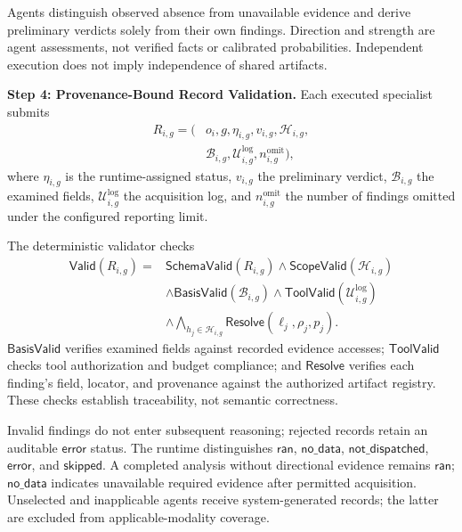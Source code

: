 Agents distinguish observed absence
from unavailable evidence and derive
preliminary verdicts solely from their
own findings. Direction and strength
are agent assessments, not verified
facts or calibrated probabilities.
Independent execution does not imply
independence of shared artifacts.

\medskip
\noindent\textbf{Step 4: Provenance-Bound
Record Validation.}
Each executed specialist submits
\begin{equation}
\begin{aligned}
R_{i,g}=\big(
&o_i,g,\eta_{i,g},v_{i,g},
\mathcal H_{i,g},\\
&\mathcal B_{i,g},
\mathcal U_{i,g}^{\mathrm{log}},
n_{i,g}^{\mathrm{omit}}
\big),
\end{aligned}
\label{eq:finding-record}
\end{equation}
where $\eta_{i,g}$ is the runtime-assigned
status, $v_{i,g}$ the preliminary
verdict, $\mathcal B_{i,g}$ the
examined fields,
$\mathcal U_{i,g}^{\mathrm{log}}$
the acquisition log, and
$n_{i,g}^{\mathrm{omit}}$ the
number of findings omitted under
the configured reporting limit.

The deterministic validator checks
\begin{equation}
\begin{aligned}
\mathsf{Valid}(R_{i,g})={}&
\mathsf{SchemaValid}(R_{i,g})
\land\mathsf{ScopeValid}(\mathcal H_{i,g})\\
&\land\mathsf{BasisValid}(\mathcal B_{i,g})
\land\mathsf{ToolValid}
(\mathcal U_{i,g}^{\mathrm{log}})\\
&\land\!\!
\bigwedge_{h_j\in\mathcal H_{i,g}}
\mathsf{Resolve}(\ell_j,\rho_j,p_j).
\end{aligned}
\label{eq:record-validity}
\end{equation}
$\mathsf{BasisValid}$ verifies
examined fields against recorded
evidence accesses;
$\mathsf{ToolValid}$ checks tool
authorization and budget compliance;
and $\mathsf{Resolve}$ verifies each
finding's field, locator, and
provenance against the authorized
artifact registry. These checks
establish traceability, not semantic
correctness.

Invalid findings do not enter
subsequent reasoning; rejected
records retain an auditable
$\mathsf{error}$ status.
The runtime distinguishes
$\mathsf{ran}$, $\mathsf{no\_data}$,
$\mathsf{not\_dispatched}$,
$\mathsf{error}$, and $\mathsf{skipped}$.
A completed analysis without
directional evidence remains
$\mathsf{ran}$; $\mathsf{no\_data}$
indicates unavailable required
evidence after permitted acquisition.
Unselected and inapplicable agents
receive system-generated records;
the latter are excluded from
applicable-modality coverage.

